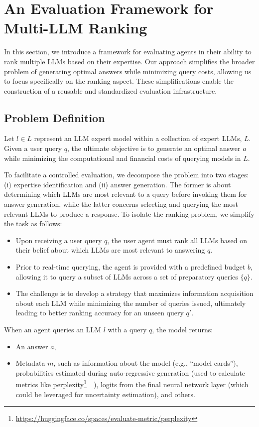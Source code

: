 \section{An Evaluation Framework for Multi-LLM Ranking}

In this section, we introduce a framework for evaluating agents in their ability to rank multiple LLMs based on their expertise. Our approach simplifies the broader problem of generating optimal answers while minimizing query costs, allowing us to focus specifically on the ranking aspect. These simplifications enable the construction of a reusable and standardized evaluation infrastructure.

\subsection{Problem Definition}

Let $l \in L$ represent an LLM expert model within a collection of expert LLMs, $L$. Given a user query $q$, the ultimate objective is to generate an optimal answer $a$ while minimizing the computational and financial costs of querying models in $L$.

To facilitate a controlled evaluation, we decompose the problem into two stages: (i) expertise identification and (ii) answer generation. The former is about determining which LLMs are most relevant to a query before invoking them for answer generation, while the latter concerns selecting and querying the most relevant LLMs to produce a response. To isolate the ranking problem, we simplify the task as follows:  
\begin{itemize}
    \item Upon receiving a user query $q$, the user agent must rank all LLMs based on their belief about which LLMs are most relevant to answering $q$.
    \item Prior to real-time querying, the agent is provided with a predefined budget $b$, allowing it to query a subset of LLMs across a set of preparatory queries $\{q\}$.
    \item The challenge is to develop a strategy that maximizes information acquisition about each LLM while minimizing the number of queries issued, ultimately leading to better ranking accuracy for an unseen query $q'$.
\end{itemize}

When an agent queries an LLM $l$ with a query $q$, the model returns:  
\begin{itemize}
    \item An answer $a$,
    \item Metadata $m$, such as information about the model (e.g., ``model cards''), probabilities estimated during auto-regressive generation (used to calculate metrics like perplexity\footnote{\url{https://huggingface.co/spaces/evaluate-metric/perplexity}}~\cite{jelinek1977perplexity}~), logits from the final neural network layer (which could be leveraged for uncertainty estimation), and others.
\end{itemize}


